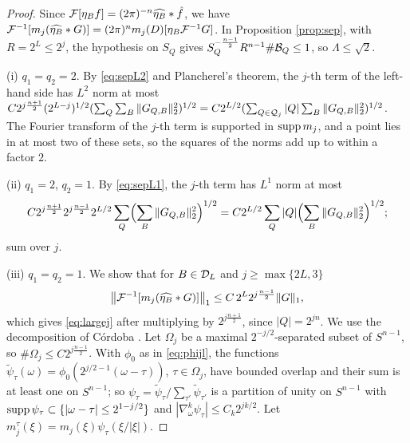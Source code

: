 \begin{proof}
Since $\mathcal F[\eta_Bf]=(2\pi)^{-n}\widehat{\eta_B}*\hat f$, we have
$\mathcal F^{-1}[m_j(\widehat{\eta_B}*G)]=(2\pi)^nm_j(D)[\eta_B\mathcal F^{-1}G]$. In Proposition \ref{prop:sep}, with $R=2^L\le2^j$,
the hypothesis on $S_Q$ gives $S_Q^{-\frac{n-1}2}R^{n-1}\#\mathcal B_Q\le1$, so $\Lambda\le\sqrt2$.

(i) $q_1=q_2=2$. By \eqref{eq:sepL2} and Plancherel's theorem, the $j$-th term of the left-hand side has $L^2$
norm at most $C2^{j\frac{n+1}2}(2^{L-j})^{1/2}(\sum_Q\sum_B\|G_{Q,B}\|_2^2)^{1/2}
=C2^{L/2}(\sum_{Q\in\mathcal Q_j}|Q|\sum_B\|G_{Q,B}\|_2^2)^{1/2}$. The Fourier transform of the $j$-th term is
supported in $\operatorname{supp} m_j$, and a point lies in at most two of these sets, so the squares of the norms add up
to within a factor $2$.

(ii) $q_1=2$, $q_2=1$. By \eqref{eq:sepL1}, the $j$-th term has $L^1$ norm at most
\[
C2^{j\frac{n+1}2}2^{j\frac{n-1}2}2^{L/2}\sum_Q\Bigl(\sum_B\|G_{Q,B}\|_2^2\Bigr)^{1/2}
=C2^{L/2}\sum_Q|Q|\Bigl(\sum_B\|G_{Q,B}\|_2^2\Bigr)^{1/2};
\]
sum over $j$.

(iii) $q_1=q_2=1$. We show that for $B\in\mathcal D_L$ and $j\ge\max\{2L,3\}$
\begin{equation}\label{eq:L1piece}
\bigl\|\mathcal F^{-1}[m_j(\widehat{\eta_B}*G)]\bigr\|_1\le C\,2^L2^{j\frac{n-1}2}\|G\|_1 ,
\end{equation}
which gives \eqref{eq:largej} after multiplying by $2^{j\frac{n+1}2}$, since $|Q|=2^{jn}$. We use the
decomposition of C\'ordoba \cite{Cor79}. Let $\Omega_j$ be a maximal $2^{-j/2}$-separated subset of $S^{n-1}$, so
$\#\Omega_j\le C2^{j\frac{n-1}2}$. With $\phi_0$ as in \eqref{eq:phijl}, the functions
$\tilde\psi_\tau(\omega)=\phi_0(2^{j/2-1}(\omega-\tau))$, $\tau\in\Omega_j$, have bounded overlap and their sum is at least
one on $S^{n-1}$; so $\psi_\tau=\tilde\psi_\tau/\sum_{\tau'}\tilde\psi_{\tau'}$ is a partition of unity on $S^{n-1}$ with
$\operatorname{supp}\psi_\tau\subset\{|\omega-\tau|\le2^{1-j/2}\}$ and $|\nabla_\omega^k\psi_\tau|\le C_k2^{jk/2}$. Let
$m_j^\tau(\xi)=m_j(\xi)\psi_\tau(\xi/|\xi|)$.


\end{proof}

